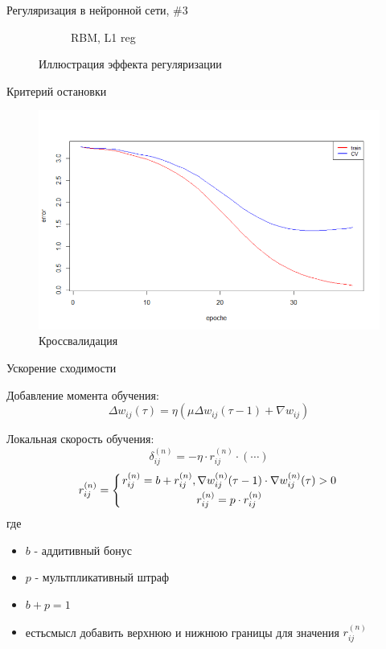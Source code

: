 \documentclass[10pt]{beamer}
\begin{document}
\begin{frame}{Регуляризация в нейронной сети, \#3}
\begin{figure}
\begin{subfigure}[b]{0.5\textwidth}
                \caption{RBM, L1 reg}                
        \end{subfigure} 
        \caption{Иллюстрация эффекта регуляризации}
\end{figure}

\end{frame}

\begin{frame}{Критерий остановки}

\begin{figure}[h!]
  \centering
  \includegraphics[width=1\textwidth]{images/cv.png}
  \caption{Кроссвалидация}
\end{figure}	
	
\end{frame}


\begin{frame}{Ускорение сходимости}

Добавление момента обучения:
\begin{equation}
\Delta w_{ij}(\tau) = \eta \left( \mu \Delta w_{ij} \left( \tau - 1 \right) + \nabla w_{ij} \right)
\end{equation}

Локальная скорость  обучения:
\begin{equation}
\delta^{(n)}_{ij} = - \eta \cdot r_{ij}^{(n)} \cdot \left( \cdots \right)
\end{equation}
\begin{equation}
r_{ij}^{(n)} = \left\{ { r_{ij}^{(n)} = b + r_{ij}^{(n)}, \nabla w_{ij}^{(n)}(\tau - 1) \cdot \nabla w_{ij}^{(n)}(\tau) > 0 \atop r_{ij}^{(n)} = p \cdot r_{ij}^{(n)} } \right.
\end{equation}
где 
\begin{itemize}
	\item $b$ - аддитивный бонус
	\item $p$ - мультпликативный штраф
	\item $b + p = 1$
	\item естьсмысл добавить верхнюю и нижнюю границы для значения $r_{ij}^{(n)}$
\end{itemize}

\end{frame}
\end{document}
